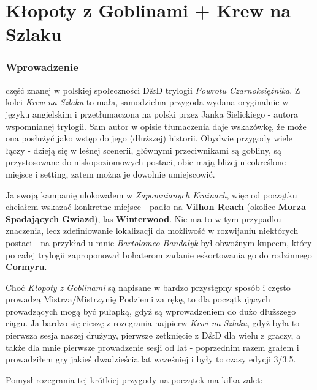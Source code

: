\clearpage

\part{Kłopoty z Goblinami + Krew na Szlaku}

\begin{twocolumn}

\section{Wprowadzenie}

 część znanej w polskiej społeczności D\&D
trylogii \emph{Powrotu Czarnoksiężnika}. Z kolei \emph{Krew na Szlaku}\cite{krew_na_szlaku} to mała, samodzielna
przygoda wydana oryginalnie w języku angielskim i przetłumaczona na polski przez Janka Sielickiego - autora wspomnianej
trylogii. Sam autor w opisie tłumaczenia daje wskazówkę, że może ona posłużyć jako wstęp do jego (dłuższej) historii.
Obydwie przygody wiele łączy - dzieją się w leśnej scenerii, głównymi przeciwnikami są gobliny, są przystosowane do
niskopoziomowych postaci, obie mają bliżej nieokreślone miejsce i setting, zatem można je dowolnie umiejscowić.

Ja swoją kampanię ulokowałem w \emph{Zapomnianych Krainach}, więc od początku chciałem wskazać konkretne miejsce - padło
na \textbf{Vilhon Reach} (okolice \textbf{Morza Spadających Gwiazd}), las \textbf{Winterwood}. Nie ma to w tym przypadku
znaczenia, lecz zdefiniowanie lokalizacji da możliwość w rozwijaniu niektórych postaci - na przykład u mnie
\emph{Bartolomeo Bandałyk} był obwoźnym kupcem, który po całej trylogii zaproponował bohaterom zadanie eskortowania go
do rodzinnego \textbf{Cormyru}.

Choć \emph{Kłopoty z Goblinami} są napisane w bardzo przystępny sposób i często prowadzą Mistrza/Mistrzynię Podziemi za
rękę, to dla początkujących prowadzących mogą być pułapką, gdyż są wprowadzeniem do dużo dłuższego ciągu. Ja bardzo się
cieszę z rozegrania najpierw \emph{Krwi na Szlaku}, gdyż była to pierwsza sesja naszej drużyny, pierwsze zetknięcie z
D\&D dla wielu z graczy, a także dla mnie pierwsze prowadzenie sesji od lat - poprzednim razem grałem i prowadziłem gry
jakieś dwadzieścia lat wcześniej i były to czasy edycji 3/3.5.

Pomysł rozegrania tej krótkiej przygody na początek ma kilka zalet:


\end{twocolumn}
